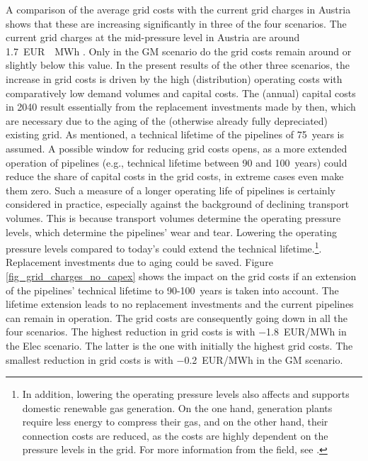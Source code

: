 A comparison of the average grid costs with the current grid charges in Austria shows that these are increasing significantly in three of the four scenarios. The current grid charges at the mid-pressure level in Austria are around \SI{1.7}{EUR \per MWh} \cite{econtrol_gas_charges}. Only in the GM scenario do the grid costs remain around or slightly below this value. In the present results of the other three scenarios, the increase in grid costs is driven by the high (distribution) operating costs with comparatively low demand volumes and capital costs. The (annual) capital costs in 2040 result essentially from the replacement investments made by then, which are necessary due to the aging of the (otherwise already fully depreciated) existing grid. As mentioned, a technical lifetime of the pipelines of \SI{75}{years} is assumed. A possible window for reducing grid costs opens, as a more extended operation of pipelines (e.g., technical lifetime between 90 and \SI{100}{years}) could reduce the share of capital costs in the grid costs, in extreme cases even make them zero. Such a measure of a longer operating life of pipelines is certainly considered in practice, especially against the background of declining transport volumes. This is because transport volumes determine the operating pressure levels, which determine the pipelines' wear and tear. Lowering the operating pressure levels compared to today's could extend the technical lifetime.\footnote{In addition, lowering the operating pressure levels also affects and supports domestic renewable gas generation. On the one hand, generation plants require less energy to compress their gas, and on the other hand, their connection costs are reduced, as the costs are highly dependent on the pressure levels in the grid. For more information from the field, see \cite{biogas_einspeisung}.}. Replacement investments due to aging could be saved. Figure \ref{fig_grid_charges_no_capex} shows the impact on the grid costs if an extension of the pipelines' technical lifetime to \SI{90}{}-\SI{100}{years} is taken into account. The lifetime extension leads to no replacement investments and the current pipelines can remain in operation. The grid costs are consequently going down in all the four scenarios. The highest reduction in grid costs is with \SI{-1.8}{EUR/MWh} in the Elec scenario. The latter is the one with initially the highest grid costs. The smallest reduction in grid costs is with \SI{-0.2}{EUR/MWh} in the GM scenario.

